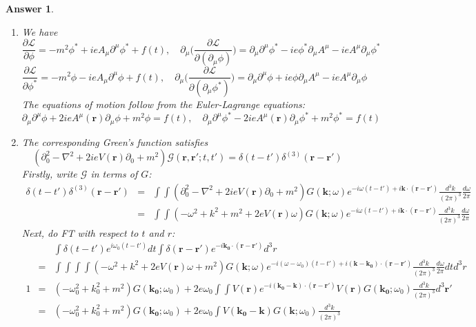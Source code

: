 \documentclass[a4paper]{article}
\newtheorem{ans}{Answer}[section]
\theoremstyle{new}
\begin{document}
\begin{ans}\leavevmode
\begin{enumerate}[label=(\alph*)]
\item We have
$$\frac{\partial\mathcal{L}}{\partial\phi}=-m^2\phi^*+ieA_\mu\partial^\mu\phi^*+f(t),\quad\partial_\mu\bigg(\frac{\partial\mathcal{L}}{\partial(\partial_\mu\phi)}\bigg)=\partial_\mu\partial^\mu\phi^*-ie\phi^*\partial_\mu A^\mu-ieA^\mu\partial_\mu\phi^*$$
$$\frac{\partial\mathcal{L}}{\partial\phi^*}=-m^2\phi-ieA_\mu\partial^\mu\phi+f(t),\quad\partial_\mu\bigg(\frac{\partial\mathcal{L}}{\partial(\partial_\mu\phi^*)}\bigg)=\partial_\mu\partial^\mu\phi+ie\phi\partial_\mu A^\mu-ieA^\mu\partial_\mu\phi$$
The equations of motion follow from the Euler-Lagrange equations:
$$\partial_\mu\partial^\mu\phi+2ieA^\mu(\mathbf{r})\partial_\mu\phi+m^2\phi=f(t),\quad\partial_\mu\partial^\mu\phi^*-2ieA^\mu(\mathbf{r})\partial_\mu\phi^*+m^2\phi^*=f(t)$$
\item The corresponding Green's function satisfies
$$(\partial_0^2-\nabla^2+2ieV(\mathbf{r})\partial_0+m^2)\mathcal{G}(\mathbf{r},\mathbf{r'};t,t')=\delta(t-t')\delta^{(3)}(\mathbf{r}-\mathbf{r'})$$
Firstly, write $\mathcal{G}$ in terms of $G$:
\begin{eqnarray}
\delta(t-t')\delta^{(3)}(\mathbf{r}-\mathbf{r'})&=&\int\int(\partial_0^2-\nabla^2+2ieV(\mathbf{r})\partial_0+m^2)G(\mathbf{k};\omega)e^{-i\omega(t-t')+i\mathbf{k}\cdot(\mathbf{r}-\mathbf{r'})}\frac{d^3k}{(2\pi)^3}\frac{d\omega}{2\pi}\nonumber\\&=&\int\int(-\omega^2+k^2+m^2+2eV(\mathbf{r})\omega)G(\mathbf{k};\omega)e^{-i\omega(t-t')+i\mathbf{k}\cdot(\mathbf{r}-\mathbf{r'})}\frac{d^3k}{(2\pi)^3}\frac{d\omega}{2\pi}\nonumber
\end{eqnarray}
Next, do FT with respect to $t$ and $r$:
\begin{eqnarray}
&&\int\delta(t-t')e^{i\omega_0(t-t')}dt\int\delta(\mathbf{r}-\mathbf{r'})e^{-i\mathbf{k_0}\cdot(\mathbf{r}-\mathbf{r'})}d^3r\nonumber\\&=&\int\int\int\int(-\omega^2+k^2+2eV(\mathbf{r})\omega+m^2)G(\mathbf{k};\omega)e^{-i(\omega-\omega_0)(t-t')+i(\mathbf{k}-\mathbf{k_0})\cdot(\mathbf{r}-\mathbf{r'})}\frac{d^3k}{(2\pi)^3}\frac{d\omega}{2\pi}dtd^3r\nonumber\\1&=&
(-\omega_0^2+k_0^2+m^2)G(\mathbf{k_0};\omega_0)+2e\omega_0\int\int V(\mathbf{r})e^{-i(\mathbf{k_0}-\mathbf{k})\cdot(\mathbf{r}-\mathbf{r'})}V(\mathbf{r})G(\mathbf{k_0};\omega_0)\frac{d^3k}{(2\pi)^3}d^3\mathbf{r'}\nonumber\\&=&(-\omega_0^2+k_0^2+m^2)G(\mathbf{k_0};\omega_0)+2e\omega_0\int V(\mathbf{k_0}-\mathbf{k})G(\mathbf{k};\omega_0)\frac{d^3k}{(2\pi)^3}\nonumber

\end{eqnarray}
\end{enumerate}
\end{ans}
\end{document}
